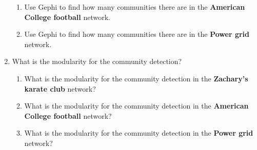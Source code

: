 \documentclass{amsart}
\theoremstyle{definition}
\theoremstyle{remark}
\numberwithin{equation}{section}
\begin{document}
\begin{enumerate}
\begin{enumerate}
        \item Use Gephi to find how many communities there are in the \textbf{American College football} network. \vspace{0.5 cm}



        \item Use Gephi to find how many communities there are in the \textbf{Power grid} network. \vspace{0.5 cm}



    \end{enumerate}
    \item What is the modularity for the community detection? \vspace{0.5 cm}
    \begin{enumerate}
        \item What is the modularity for the community detection in the \textbf{Zachary’s karate club} network? \vspace{0.5 cm}



        \item What is the modularity for the community detection in the \textbf{American College football} network? \vspace{0.5 cm}



        \item What is the modularity for the community detection in the \textbf{Power grid} network? \vspace{0.5 cm}



    \end{enumerate}
\end{enumerate}
\end{document}
